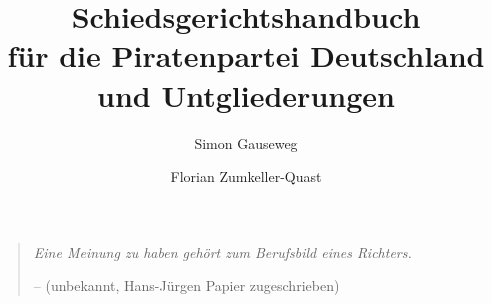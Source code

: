\documentclass{sghandbuch}
\author{Simon Gauseweg \and Florian Zumkeller-Quast}
\title{Schiedsgerichtshandbuch\\
für die Piratenpartei Deutschland und Untgliederungen\\
\hfill\break
\hfill\break
\normalsize{\documentversion}}
\begin{document}
\maketitle

\onecolumn			%
\thispagestyle{plain}		%
\hfill				%
\vfill				%
\begin{quote}
\centering			%
\itshape
\Huge
Eine Meinung zu haben gehört zum Berufsbild eines Richters.

\par
\begin{flushright}
\Large
\normalfont
-- (unbekannt, Hans-Jürgen Papier zugeschrieben)
\end{flushright}
\end{quote}
\hfill				%
\vfill				%
\clearpage			%
\twocolumn			%

\tableofcontents
























\appendix


\onecolumn
\printbibliography[heading=bibliography]
\twocolumn

\printindex[jurisdiction]
\end{document}
